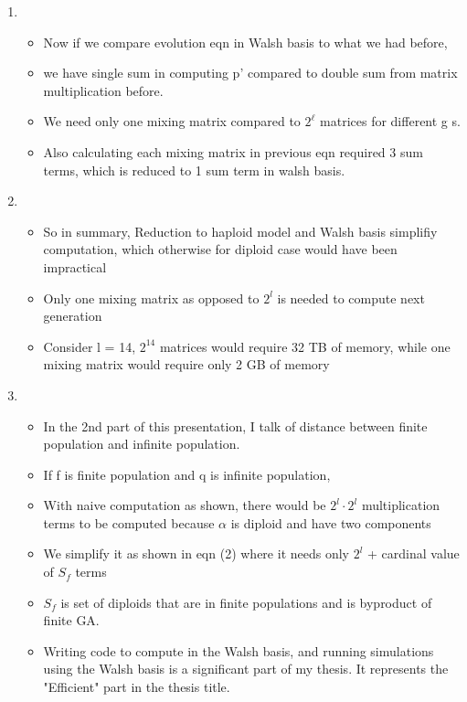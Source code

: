 \documentclass{article}
\begin{document}
\begin{enumerate}
\item
  \begin{itemize}
  \item Now if we compare evolution eqn in Walsh basis to what we had before,
  \item we have single sum in computing p' compared to double sum from matrix multiplication before. 
  \item We need only one mixing matrix compared to $2^\ell$ matrices for different g s.
  \item Also calculating each mixing matrix in previous eqn required 3 sum terms, which is reduced to 1 sum term in walsh basis.   
  \end{itemize}
    
\item
  \begin{itemize}
  
  \item So in summary, Reduction to haploid model and Walsh basis simplifiy computation, which otherwise for diploid case would have been impractical
  \item Only one mixing matrix as opposed to $2^l$ is needed to compute next generation
  \item Consider l = 14, $2^{14}$ matrices would require 32 TB of
    memory, while one mixing matrix would require only 2 GB of memory
  
  \end{itemize}
    
\item
  \begin{itemize}
  \item In the 2nd part of this presentation, I talk of distance between finite population and infinite population.
  \item If f is finite population and q is infinite population,
  \item With naive computation as shown, there would
    be $2^l \cdot 2^l$ multiplication terms to be computed because $\alpha$ is diploid and have two components  
  \item We simplify it as shown in eqn (2) where it needs only $2^l$ +
    cardinal value of $S_f$ terms
  \item $S_f$ is set of diploids that are in finite populations and is byproduct of finite GA.
  
  \item Writing code to compute in the Walsh basis, and running simulations using the Walsh basis 
  is a significant part of my thesis. It represents the "Efficient" part in the thesis title.
  \end{itemize}
  

\end{enumerate}
\end{document}
